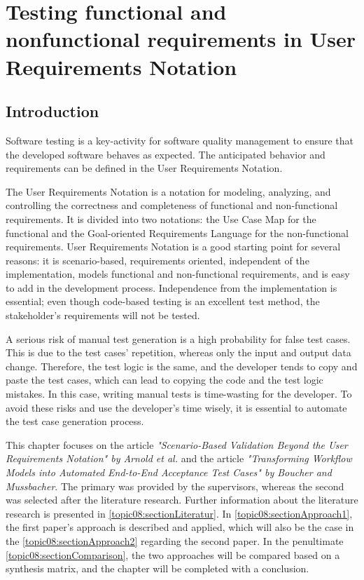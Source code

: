 
\chapter{Testing functional and nonfunctional requirements in User Requirements Notation}\label{sec:topic_8}


\section{Introduction}

Software testing is a key-activity for software quality management to ensure that the developed software behaves as expected. The anticipated behavior and requirements can be defined in the User Requirements Notation. 

The User Requirements Notation is a notation for modeling, analyzing, and controlling the correctness and completeness of functional and non-functional requirements. It is divided into two notations: the Use Case Map for the functional and the Goal-oriented Requirements Language for the non-functional requirements. User Requirements Notation is a good starting point for several reasons: it is scenario-based, requirements oriented, independent of the implementation, models functional and non-functional requirements, and is easy to add in the development process. Independence from the implementation is essential; even though code-based testing is an excellent test method, the stakeholder's requirements will not be tested.

A serious risk of manual test generation is a high probability for false test cases. This is due to the test cases' repetition, whereas only the input and output data change. Therefore, the test logic is the same, and the developer tends to copy and paste the test cases, which can lead to copying the code and the test logic mistakes. In this case, writing manual tests is time-wasting for the developer.  To avoid these risks and use the developer's time wisely, it is essential to automate the test case generation process.

This chapter focuses on the article \textit{"Scenario-Based Validation Beyond the User Requirements Notation" by Arnold et al.}\cite{ArnoldCorriveauShi2010} and the article \textit{"Transforming Workflow Models into Automated End-to-End Acceptance Test Cases" by Boucher and Mussbacher}\cite{BoucherMussbacher2017}. The primary was provided by the supervisors, whereas the second was selected after the literature research. Further information about the literature research is presented in \autoref{topic08:sectionLiteratur}. In \autoref{topic08:sectionApproach1}, the first paper's approach is described and applied, which will also be the case in the \autoref{topic08:sectionApproach2} regarding the second paper. In the penultimate \autoref{topic08:sectionComparison}, the two approaches will be compared based on a synthesis matrix, and the chapter will be completed with a conclusion.

